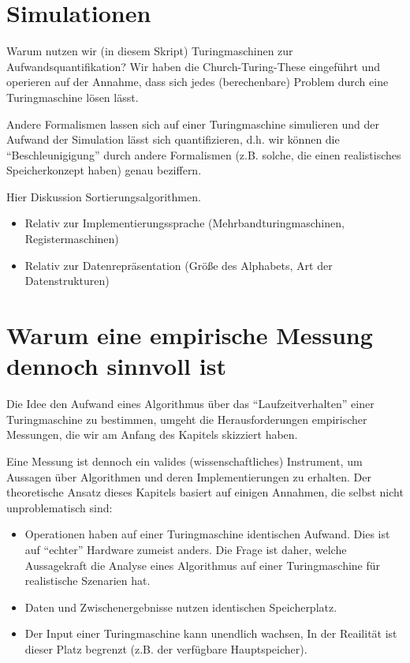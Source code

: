 
\section{Simulationen}

Warum nutzen wir (in diesem Skript) Turingmaschinen zur Aufwandsquantifikation?
Wir haben die Church-Turing-These eingeführt und operieren auf der Annahme,
dass sich jedes (berechenbare) Problem durch eine Turingmaschine lösen lässt.

Andere Formalismen lassen sich auf einer Turingmaschine simulieren und
der Aufwand der Simulation lässt sich quantifizieren,
d.h. wir können die ``Beschleunigigung'' durch andere Formalismen
(z.B. solche, die einen realistisches Speicherkonzept haben)
genau beziffern.

Hier Diskussion Sortierungsalgorithmen.
\begin{itemize}
    \item Relativ zur Implementierungssprache (Mehrbandturingmaschinen, Registermaschinen)
    \item Relativ zur Datenrepräsentation (Größe des Alphabets, Art der Datenstrukturen)
\end{itemize}

\section{Warum eine empirische Messung dennoch sinnvoll ist}
Die Idee den Aufwand eines Algorithmus über das ``Laufzeitverhalten'' einer Turingmaschine zu bestimmen,
umgeht die Herausforderungen empirischer Messungen, die wir am Anfang des Kapitels skizziert haben.

Eine Messung ist dennoch ein valides (wissenschaftliches) Instrument,
um Aussagen über Algorithmen und deren Implementierungen zu erhalten.
Der theoretische Ansatz dieses Kapitels basiert auf einigen Annahmen,
die selbst nicht unproblematisch sind:
\begin{itemize}
  \item Operationen haben auf einer Turingmaschine identischen Aufwand.
    Dies ist auf ``echter'' Hardware zumeist anders.
    Die Frage ist daher, welche Aussagekraft die Analyse eines Algorithmus auf einer Turingmaschine für realistische Szenarien hat. 
  \item Daten und Zwischenergebnisse nutzen identischen Speicherplatz.
  \item Der Input einer Turingmaschine kann unendlich wachsen,
      In der Reailität ist dieser Platz begrenzt (z.B. der verfügbare Hauptspeicher).
\end{itemize}
